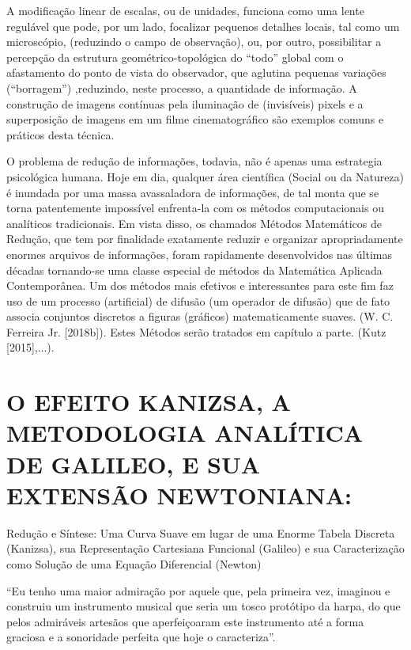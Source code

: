     A modificação linear de escalas, ou de unidades, funciona como uma lente regulável que pode, por um lado, focalizar pequenos detalhes locais, tal como um microscópio, (reduzindo o campo de observação), ou, por outro, possibilitar a percepção da estrutura geométrico-topológica do ``todo'' global com o afastamento do ponto de vista do observador, que aglutina pequenas variações (``borragem'') ,reduzindo, neste processo, a quantidade de informação. A construção de imagens contínuas pela iluminação de (invisíveis) pixels e a superposição de imagens em um filme cinematográfico são exemplos comuns e práticos desta técnica.

    O problema de redução de informações, todavia, não é apenas uma estrategia psicológica humana. Hoje em dia, qualquer área científica (Social ou da Natureza) é inundada por uma massa avassaladora de informações, de tal monta que se torna patentemente impossível enfrenta-la com os métodos computacionais ou analíticos tradicionais. Em vista disso, os chamados Métodos Matemáticos de Redução, que tem por finalidade exatamente reduzir e organizar apropriadamente enormes arquivos de informações, foram rapidamente desenvolvidos nas últimas décadas tornando-se uma classe especial de métodos da Matemática Aplicada Contemporânea. Um dos métodos mais efetivos e interessantes para este fim faz uso de um processo (artificial) de difusão (um operador de difusão) que de fato associa conjuntos discretos a figuras (gráficos) matematicamente suaves. (W. C. Ferreira Jr. [2018b]). Estes Métodos serão tratados em capítulo a parte. (Kutz [2015],...).



\section{O EFEITO KANIZSA, A METODOLOGIA ANALÍTICA DE GALILEO, E SUA EXTENSÃO NEWTONIANA:}

Redução e Síntese: Uma Curva Suave em lugar de uma Enorme Tabela Discreta (Kanizsa), sua Representação Cartesiana Funcional (Galileo) e sua Caracterização como Solução de uma Equação Diferencial (Newton)

\begin{citacao}
    ``Eu tenho uma maior admiração por aquele que, pela primeira vez, imaginou e construiu um instrumento musical que seria um tosco protótipo da harpa, do que pelos admiráveis artesãos que aperfeiçoaram este instrumento até a forma graciosa e a sonoridade perfeita que hoje o caracteriza''.
    
\end{citacao}

